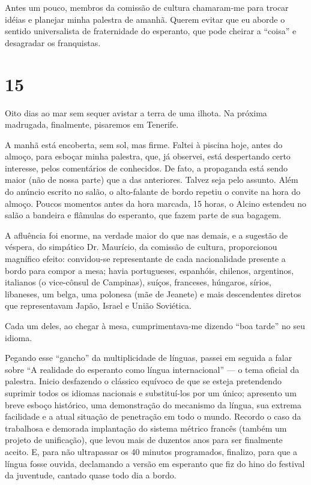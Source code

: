 Antes um pouco, membros da comissão de cultura chamaram-me para trocar idéias e planejar minha palestra de amanhã. Querem evitar que eu aborde o sentido universalista de fraternidade do esperanto, que pode cheirar a ``coisa'' e desagradar os franquistas.

\section*{15 \adfflatleafright {}}

Oito dias ao mar sem sequer avistar a terra de uma ilhota. Na próxima madrugada, finalmente, pisaremos em Tenerife.

A manhã está encoberta, sem sol, mas firme. Faltei à piscina hoje, antes do almoço, para esboçar minha palestra, que, já observei, está despertando certo interesse, pelos comentários de conhecidos. De fato, a propaganda está sendo maior (não de nossa parte) que a das anteriores. Talvez seja pelo assunto. Além do anúncio escrito no salão, o alto-falante de bordo repetiu o convite na hora do almoço. Poucos momentos antes da hora marcada, 15 horas, o Alcino estendeu no salão a bandeira e flâmulas do esperanto, que fazem parte de sua bagagem.

A afluência foi enorme, na verdade maior do que nas demais, e a sugestão de véspera, do simpático Dr. Maurício, da comissão de cultura, proporcionou magnífico efeito: convidou-se representante de cada nacionalidade presente a bordo para compor a mesa; havia portugueses, espanhóis, chilenos, argentinos, italianos (o vice-cônsul de Campinas), suíços, franceses, húngaros, sírios, libaneses, um belga, uma polonesa (mãe de Jeanete) e mais descendentes diretos que representavam Japão, Israel e União Soviética.

Cada um deles, ao chegar à mesa, cumprimentava-me dizendo ``boa tarde'' no seu idioma.

Pegando esse ``gancho'' da multiplicidade de línguas, passei em seguida a falar sobre ``A realidade do esperanto como língua internacional'' --- o tema oficial da palestra. Inicio desfazendo o clássico equívoco de que se esteja pretendendo suprimir todos os idiomas nacionais e substituí-los por um único; apresento um breve esboço histórico, uma demonstração do mecanismo da língua, sua extrema facilidade e a atual situação de penetração em todo o mundo. Recordo o caso da trabalhosa e demorada implantação do sistema métrico francês (também um projeto de unificação), que levou mais de duzentos anos para ser finalmente aceito. E, para não ultrapassar os 40 minutos programados, finalizo, para que a língua fosse ouvida, declamando a versão em esperanto que fiz do hino do festival da juventude, cantado quase todo dia a bordo.

